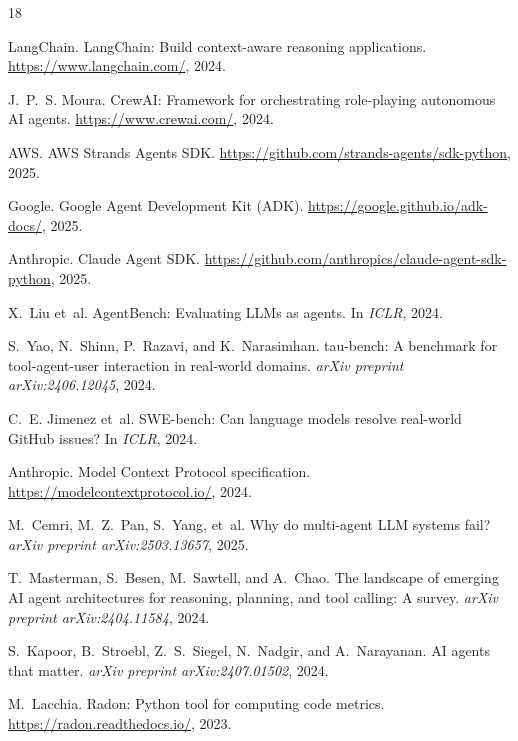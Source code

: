 \documentclass[sigconf]{acmart}
\begin{document}

\begin{thebibliography}{18}

LangChain.
\newblock LangChain: Build context-aware reasoning applications.
\newblock \url{https://www.langchain.com/}, 2024.

J.~P.~S. Moura.
\newblock CrewAI: Framework for orchestrating role-playing autonomous AI agents.
\newblock \url{https://www.crewai.com/}, 2024.

AWS.
\newblock AWS Strands Agents SDK.
\newblock \url{https://github.com/strands-agents/sdk-python}, 2025.

Google.
\newblock Google Agent Development Kit (ADK).
\newblock \url{https://google.github.io/adk-docs/}, 2025.

Anthropic.
\newblock Claude Agent SDK.
\newblock \url{https://github.com/anthropics/claude-agent-sdk-python}, 2025.

X.~Liu et~al.
\newblock AgentBench: Evaluating LLMs as agents.
\newblock In \emph{ICLR}, 2024.

S.~Yao, N.~Shinn, P.~Razavi, and K.~Narasimhan.
\newblock tau-bench: A benchmark for tool-agent-user interaction in real-world domains.
\newblock \emph{arXiv preprint arXiv:2406.12045}, 2024.

C.~E. Jimenez et~al.
\newblock SWE-bench: Can language models resolve real-world GitHub issues?
\newblock In \emph{ICLR}, 2024.

Anthropic.
\newblock Model Context Protocol specification.
\newblock \url{https://modelcontextprotocol.io/}, 2024.

M.~Cemri, M.~Z.~Pan, S.~Yang, et~al.
\newblock Why do multi-agent LLM systems fail?
\newblock \emph{arXiv preprint arXiv:2503.13657}, 2025.

T.~Masterman, S.~Besen, M.~Sawtell, and A.~Chao.
\newblock The landscape of emerging AI agent architectures for reasoning, planning, and tool calling: A survey.
\newblock \emph{arXiv preprint arXiv:2404.11584}, 2024.

S.~Kapoor, B.~Stroebl, Z.~S.~Siegel, N.~Nadgir, and A.~Narayanan.
\newblock AI agents that matter.
\newblock \emph{arXiv preprint arXiv:2407.01502}, 2024.

M.~Lacchia.
\newblock Radon: Python tool for computing code metrics.
\newblock \url{https://radon.readthedocs.io/}, 2023.


\end{thebibliography}
\end{document}
